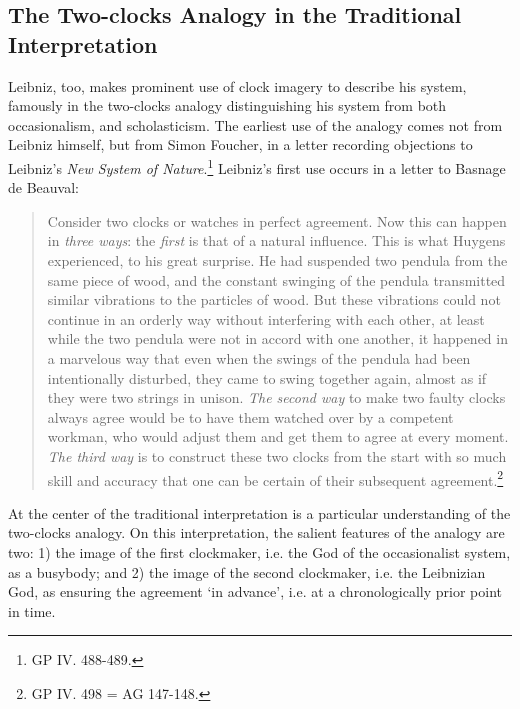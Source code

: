 \documentclass{article}
\begin{document}
\subsection{The Two-clocks Analogy in the Traditional Interpretation}

Leibniz, too, makes prominent use of clock imagery to describe his
system, famously in the two-clocks analogy distinguishing his system
from both occasionalism, and scholasticism. The earliest use of the
analogy comes not from Leibniz himself, but from Simon Foucher, in a
letter recording objections to Leibniz's \emph{New System of
Nature}.\footnote{GP IV. 488-489.} Leibniz's first use occurs in a
letter to Basnage de Beauval:

\begin{quote}
Consider two clocks or watches in perfect agreement. Now this can happen
in \emph{three ways}: the \emph{first} is that of a natural influence.
This is what Huygens experienced, to his great surprise. He had
suspended two pendula from the same piece of wood, and the constant
swinging of the pendula transmitted similar vibrations to the particles
of wood. But these vibrations could not continue in an orderly way
without interfering with each other, at least while the two pendula were
not in accord with one another, it happened in a marvelous way that even
when the swings of the pendula had been intentionally disturbed, they
came to swing together again, almost as if they were two strings in
unison. \emph{The second way} to make two faulty clocks always agree
would be to have them watched over by a competent workman, who would
adjust them and get them to agree at every moment. \emph{The third way}
is to construct these two clocks from the start with so much skill and
accuracy that one can be certain of their subsequent
agreement.\footnote{GP IV. 498 = AG 147-148.}
\end{quote}

At the center of the traditional interpretation is a particular
understanding of the two-clocks analogy. On this interpretation, the
salient features of the analogy are two: 1) the image of the first
clockmaker, i.e. the God of the occasionalist system, as a busybody; and
2) the image of the second clockmaker, i.e. the Leibnizian God, as
ensuring the agreement `in advance', i.e. at a chronologically prior
point in time.
\end{document}
